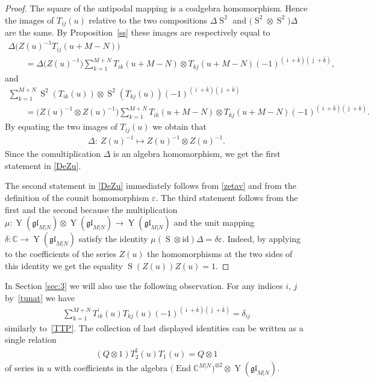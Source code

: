 \documentclass[pdftex]{sigma}
\numberwithin{equation}{section}
\def\bi{{\bar\imath }}
\def\bj{{\bar\jmath }}
\def\bk{{\bar k }}
\def\CC{{\mathbb{C}}}
\def\CMN{\CC^{M|N}}
\def\de{\delta}
\def\De{\Delta}
\def\End{\operatorname{End}}
\def\ep{\varepsilon}
\def\glMN{\mathfrak{gl}_{M|N}}
\def\id{{\mathrm{id}}}
\def\ot{\otimes}
\def\S{\operatorname{S}}
\def\TP{T^{\prime}}
\def\TS{T^{\sharp}}
\def\YMN{\operatorname{Y}(\glMN)}
\begin{document}
\begin{proof}
The square of the antipodal mapping is a coalgebra homomorphism.
Hence the images of
$T_{ij}(u)$ relative to the two compositions
$\De \S^{2}$ and $\big(\S^{2}\ot\S^{2}\big) \De$
are the same. By Proposition~\ref{ss} these images are respectively equal to
\begin{gather*}
\De \big( Z(u)^{-1} T_{ij}(u+M-N)\big)\\
\qquad {} = \De \big( Z(u)^{-1}\big) \sum_{k=1}^{M+N}
T_{ik}(u+M-N)\ot T_{kj}(u+M-N)
{(-1)}^{( \bi + \bk )( \bj + \bk )} ,
\end{gather*}
and
\begin{gather*}
\sum_{k=1}^{M+N}
\S^{2}( T_{ik}(u))\ot\S^{2}( T_{kj}(u))
{(-1)}^{( \bi + \bk )( \bj + \bk )}\\
\qquad{} =
\big( Z(u)^{-1}\ot Z(u)^{-1}\big)
\sum_{k=1}^{M+N}
T_{ik}(u+M-N)\ot T_{kj}(u+M-N)
{(-1)}^{( \bi + \bk )( \bj + \bk )} .
\end{gather*}
By equating the two images of $T_{ij}(u)$ we obtain that
\begin{gather*}
\De\colon \ Z(u)^{-1}\mapsto Z(u)^{-1}\ot Z(u)^{-1} .
\end{gather*}
Since the comultiplication $\De$ is an algebra homomorphism,
we get the first statement in \eqref{DeZu}.

The second statement in \eqref{DeZu} immediately follows from
\eqref{zetav} and from the definition of the counit homomorphism $\ep $.
The third statement follows from the first and the second because the
multiplication $\mu\colon \YMN\ot\YMN\to\YMN$ and the unit mapping
$\de\colon \CC\to\YMN$ satisfy the identity
$\mu (\S\ot\id) \De=\de \ep$. Indeed,
by applying to the coefficients of the series
$Z(u)$ the homomorphisms at the two sides of this identity we get the equality $\S(Z(u)) Z(u)=1 $.
\end{proof}

In Section \ref{sec:3} we will also use the following observation.
For any indices $i$, $j$ by~\eqref{tunat} we have
\begin{gather*}
\sum_{k=1}^{M+N} \TP_{ik}(u) T_{kj}(u)
{(-1)}^{( \bi + \bk )( \bj + \bk )}
=\delta_{ij}
\end{gather*}
similarly to~\eqref{TTP}.
The collection of last displayed identities can be written as a
single relation
\begin{gather}\label{QTT}
(Q\ot1) \TS_2(u) T_1(u)=Q\ot1
\end{gather}
of series in $u$ with coefficients in the algebra
$\big(\End\CMN\big)^{\ot 2}\ot\YMN $.
\end{document}
